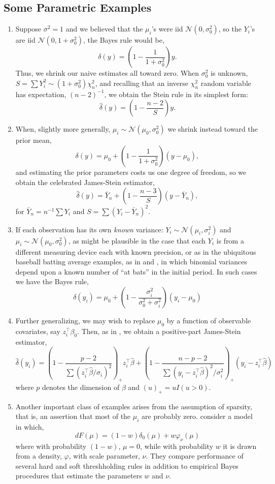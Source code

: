 \documentclass[12pt]{amsart}
\def\NN{\mathcal N}
\begin{document}
\subsection{Some Parametric Examples}
\begin{enumerate}
	\item Suppose $\sigma^2 = 1$ and we believed that the $\mu_i$'s were iid
$\NN (0 , \sigma_0^2)$, so the $Y_i$'s are iid $\NN (0 , 1 + \sigma_0^2)$, 
the Bayes rule would be,
\[
\delta (y) = \left ( 1 - \frac{1}{1 + \sigma_0^2} \right ) y.
\]
Thus, we shrink our naive estimates all toward zero.  When $\sigma_0^2$
is unknown, $S = \sum Y_i^2 \sim (1 + \sigma_0^2) \chi_n^2$, and
recalling that an inverse $\chi_n^2$ random variable has expectation,
$(n-2)^{-1}$, we obtain the Stein rule in its simplest form:
\[
\hat \delta (y) = \left ( 1 - \frac{n-2}{S} \right ) y.
\]
\item When, slightly more generally, $\mu_i \sim \NN (\mu_0 , \sigma_0^2)$
we shrink instead  toward the prior mean,
\[
\delta (y) = \mu_0 + \left ( 1 - \frac{1}{1 + \sigma_0^2} \right ) (y - \mu_0),
\]
and estimating the prior parameters costs us one degree of freedom, so
we obtain the celebrated James-Stein estimator,
\[
\hat \delta (y) = \bar Y_n + \left ( 1 - \frac{n-3}{S} \right ) 
(y - \bar Y_n),
\]
for $\bar Y_n = n^{-1} \sum Y_i$ and $S = \sum (Y_i - \bar Y_n)^2.$

\item If each observation has its own {\it known} variance:
$Y_i \sim \NN(\mu_i, \sigma_i^2)$ and $\mu_i \sim \NN(\mu_0 , \sigma_0^2)$,
as might be plausible in the case that each $Y_i$ is from a different 
measuring device each with known precision, or as in the ubiquitous baseball 
batting average examples, as in  and ,
in which binomial variances depend upon a known number of ``at bats'' in 
the initial period.  In such cases we have the Bayes rule,
\[
\delta (y_i) 
= \mu_0 + \left( 1 - \frac{\sigma_i^2}{\sigma_0^2 + \sigma_i^2} \right ) (y_i - \mu_0 )
\]
\item Further generalizing, we may wish to replace $\mu_0$ by a function of 
observable covariates, say $z_i^\top \beta_0$. Then, as in
, we obtain a positive-part James-Stein estimator,
\[
\hat \delta (y_i) = \left( 1 - 
\frac{p-2}{\sum (z_i^\top \hat \beta/\sigma_i)^2} \right )_+ 
z_i^\top \hat \beta + 
\left (1 - \frac{n - p-2}{\sum (y_i - z_i^\top \hat \beta)^2/\sigma_i^2} \right )_+ 
(y_i - z_i^\top \hat \beta)
\]
where $p$ denotes the dimension of $\beta$ and $(u)_+ = u I(u > 0)$.  

\item Another important class of examples arises from the assumption  of sparsity,
	that is, an assertion that most of the $\mu_i$ are probably zero.  
	consider a model in which,
	\[
	dF(\mu) = (1-w) \delta_0 (\mu) + w \varphi_\nu (\mu )
	\]
	where with probability $(1-w)$, $\mu = 0$, while with probability $w$
	it is drawn from a density, $\varphi$, with scale parameter, $\nu$.
	They compare performance of several hard and soft threshholding rules
	in addition to empirical Bayes procedures that estimate the parameters
	$w$ and $\nu$.  
\end{enumerate}
\end{document}
